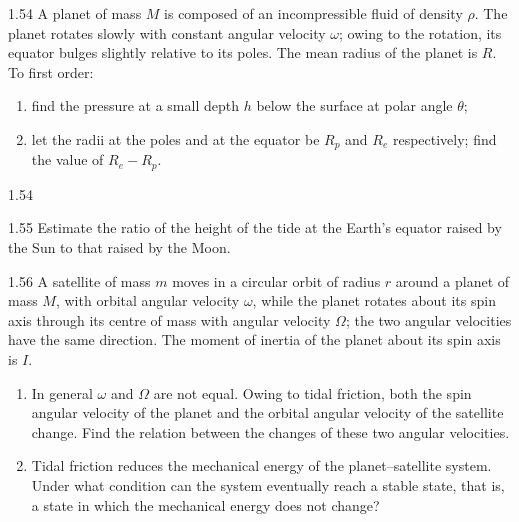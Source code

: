 \begin{problem}{1.54}
A planet of mass $M$ is composed of an incompressible fluid of density $\rho$. The planet rotates slowly with constant angular velocity $\omega$; owing to the rotation, its equator bulges slightly relative to its poles. The mean radius of the planet is $R$. To first order:
\begin{enumerate}[label=(\arabic*),leftmargin=2.2em,itemsep=1pt,topsep=2pt]
\item find the pressure at a small depth $h$ below the surface at polar angle $\theta$;
\item let the radii at the poles and at the equator be $R_p$ and $R_e$ respectively; find the value of $R_e-R_p$.
\end{enumerate}
\end{problem}

\begin{figbox}{1.54}
\end{figbox}

\begin{problem}{1.55}
Estimate the ratio of the height of the tide at the Earth's equator raised by the Sun to that raised by the Moon.
\end{problem}

\begin{problem}{1.56}
A satellite of mass $m$ moves in a circular orbit of radius $r$ around a planet of mass $M$, with orbital angular velocity $\omega$, while the planet rotates about its spin axis through its centre of mass with angular velocity $\Omega$; the two angular velocities have the same direction. The moment of inertia of the planet about its spin axis is $I$.
\begin{enumerate}[label=(\arabic*),leftmargin=2.2em,itemsep=1pt,topsep=2pt]
\item In general $\omega$ and $\Omega$ are not equal. Owing to tidal friction, both the spin angular velocity of the planet and the orbital angular velocity of the satellite change. Find the relation between the changes of these two angular velocities.
\item Tidal friction reduces the mechanical energy of the planet--satellite system. Under what condition can the system eventually reach a stable state, that is, a state in which the mechanical energy does not change?
\end{enumerate}
\end{problem}

